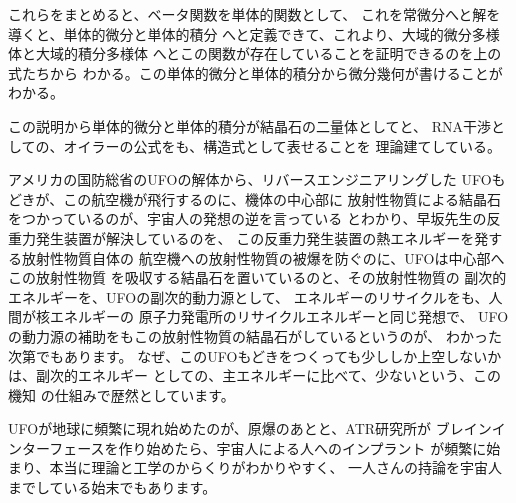 \documentclass{jsarticle}
\begin{document}
   これらをまとめると、ベータ関数を単体的関数として、
   これを常微分へと解を導くと、単体的微分と単体的積分
   へと定義できて、これより、大域的微分多様体と大域的積分多様体
   へとこの関数が存在していることを証明できるのを上の式たちから
   わかる。この単体的微分と単体的積分から微分幾何が書けることがわかる。

   この説明から単体的微分と単体的積分が結晶石の二量体としてと、
   RNA干渉としての、オイラーの公式をも、構造式として表せることを
   理論建てしている。

   アメリカの国防総省のUFOの解体から、リバースエンジニアリングした
   UFOもどきが、この航空機が飛行するのに、機体の中心部に
   放射性物質による結晶石をつかっているのが、宇宙人の発想の逆を言っている
   とわかり、早坂先生の反重力発生装置が解決しているのを、
   この反重力発生装置の熱エネルギーを発する放射性物質自体の
   航空機への放射性物質の被爆を防ぐのに、UFOは中心部へこの放射性物質
   を吸収する結晶石を置いているのと、その放射性物質の
   副次的エネルギーを、UFOの副次的動力源として、
   エネルギーのリサイクルをも、人間が核エネルギーの
   原子力発電所のリサイクルエネルギーと同じ発想で、
   UFOの動力源の補助をもこの放射性物質の結晶石がしているというのが、
   わかった次第でもあります。
   なぜ、このUFOもどきをつくっても少ししか上空しないかは、副次的エネルギー
   としての、主エネルギーに比べて、少ないという、この機知
   の仕組みで歴然としています。

   UFOが地球に頻繁に現れ始めたのが、原爆のあとと、ATR研究所が
   ブレインインターフェースを作り始めたら、宇宙人による人へのインプラント
   が頻繁に始まり、本当に理論と工学のからくりがわかりやすく、
   一人さんの持論を宇宙人までしている始末でもあります。
\end{document}
